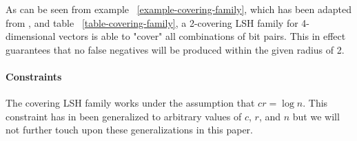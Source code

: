 As can be seen from example ~\ref{example-covering-family}, which has been adapted from \cite[example 2.1]{DBLP:journals/corr/PhamP16}, and table ~\ref{table-covering-family}, a 2-covering LSH family for 4-dimensional vectors is able to "cover" all combinations of bit pairs. This in effect guarantees that no false negatives will be produced within the given radius of 2.

\paragraph{Constraints} The covering LSH family works under the assumption that $cr = \log n$. This constraint has in \cite{DBLP:journals/corr/Pagh15} been generalized to arbitrary values of $c$, $r$, and $n$ but we will not further touch upon these generalizations in this paper.
